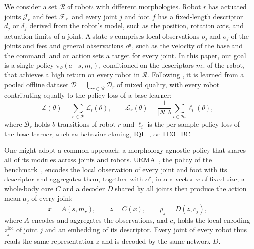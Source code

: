 We consider a set $\mathcal{R}$ of robots with different morphologies. Robot $r$ has actuated joints $\mathcal{J}_r$
and feet $\mathcal{F}_r$, and every joint $j$ and foot $f$ has a fixed-length descriptor $d_j$ or $d_f$ derived from the
robot's model, such as the position, rotation axis, and actuation limits of a joint. A state $s$ comprises local
observations $o_j$ and $o_f$ of the joints and feet and general observations $o^{\mathrm{g}}$, such as the velocity of
the base and the command, and an action sets a target for every joint. In this paper, our goal is a single policy
$\pi_{\theta}(a\mid s,m_r)$, conditioned on the descriptors $m_r$ of the robot, that achieves a high return on every
robot in $\mathcal{R}$. Following \citet{abe2026crossembodimentoffline}, it is learned from a pooled offline dataset
$\mathcal{D}=\bigcup_{r\in\mathcal{R}}\mathcal{D}_r$ of mixed quality, with every robot contributing equally to the
policy loss of a base learner:
\begin{equation}
\mathcal{L}(\theta)=\sum_{r\in\mathcal{R}}\mathcal{L}_r(\theta),\qquad
\mathcal{L}_r(\theta)=\frac{1}{|\mathcal{R}|\,b}\sum_{i\in\mathcal{B}_r}\ell_i(\theta),
\label{eq:actor_loss}
\end{equation}
where $\mathcal{B}_r$ holds $b$ transitions of robot $r$ and $\ell_i$ is the per-sample policy loss of the base learner,
such as behavior cloning, IQL~\citep{kostrikov2022iql}, or TD3+BC~\citep{fujimoto2021minimalist}.

One might adopt a common approach: a morphology-agnostic policy that shares all of its modules across joints and
robots. URMA~\citep{bohlinger2024onepolicy}, the policy of the benchmark~\citep{abe2026crossembodimentoffline}, encodes
the local observation of every joint and foot with its descriptor and aggregates them, together with $o^{\mathrm{g}}$,
into a vector $x$ of fixed size; a whole-body core $C$ and a decoder $D$ shared by all joints then produce the action
mean $\mu_j$ of every joint:
\begin{equation}
x=A(s,m_r),\qquad z=C(x),\qquad \mu_j=D(z,c_j),
\label{eq:urma}
\end{equation}
where $A$ encodes and aggregates the observations, and $c_j$ holds the local encoding $z^{\mathrm{loc}}_j$ of joint $j$
and an embedding of its descriptor. Every joint of every robot thus reads the same representation $z$ and is decoded by
the same network $D$.

